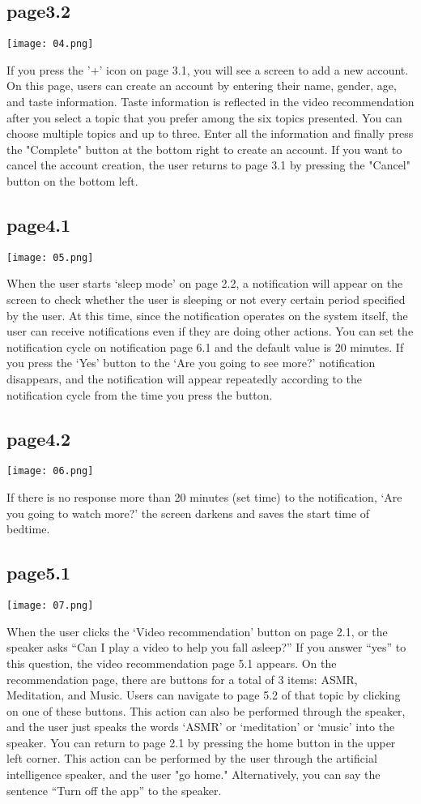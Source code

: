 \documentclass[conference]{IEEEtran}
\begin{document}
\subsection{page3.2}
\centerline{\texttt{[image: 04.png]}}
If you press the '+' icon on page 3.1, you will see a screen to add a new account. On this page, users can create an account by entering their name, gender, age, and taste information. Taste information is reflected in the video recommendation after you select a topic that you prefer among the six topics presented. You can choose multiple topics and up to three. Enter all the information and finally press the "Complete" button at the bottom right to create an account. If you want to cancel the account creation, the user returns to page 3.1 by pressing the "Cancel" button on the bottom left.
\subsection{page4.1}
\centerline{\texttt{[image: 05.png]}}
When the user starts ‘sleep mode’ on page 2.2, a notification will appear on the screen to check whether the user is sleeping or not every certain period specified by the user. At this time, since the notification operates on the system itself, the user can receive notifications even if they are doing other actions. You can set the notification cycle on notification page 6.1 and the default value is 20 minutes. If you press the ‘Yes’ button to the ‘Are you going to see more?’ notification disappears, and the notification will appear repeatedly according to the notification cycle from the time you press the button.
\subsection{page4.2}
\centerline{\texttt{[image: 06.png]}}
If there is no response more than 20 minutes (set time) to the notification, ‘Are you going to watch more?’ the screen darkens and saves the start time of bedtime.
\subsection{page5.1}
\centerline{\texttt{[image: 07.png]}}
When the user clicks the ‘Video recommendation’ button on page 2.1, or the speaker asks “Can I play a video to help you fall asleep?” If you answer “yes” to this question, the video recommendation page 5.1 appears. On the recommendation page, there are buttons for a total of 3 items: ASMR, Meditation, and Music. Users can navigate to page 5.2 of that topic by clicking on one of these buttons. This action can also be performed through the speaker, and the user just speaks the words ‘ASMR’ or ‘meditation’ or ‘music’ into the speaker. You can return to page 2.1 by pressing the home button in the upper left corner. This action can be performed by the user through the artificial intelligence speaker, and the user "go home." Alternatively, you can say the sentence “Turn off the app” to the speaker.
\end{document}
